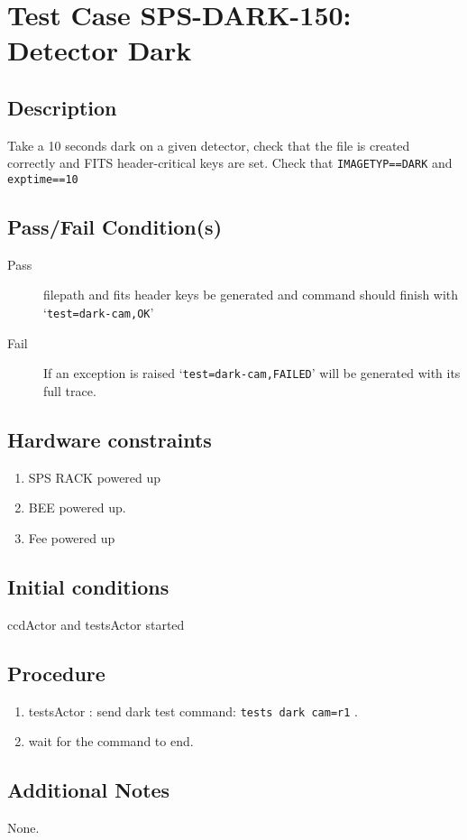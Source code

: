 \section{Test Case SPS-DARK-150: Detector Dark}

\subsection{Description}

Take a 10 seconds dark on a given detector, check that the file is created correctly 
and FITS header-critical keys are set.
Check that \texttt{IMAGETYP==DARK} and \texttt{exptime==10}

\subsection{Pass/Fail Condition(s)}

\begin{description}
\item [Pass] filepath and fits header keys be generated and command should finish with `\texttt{test=dark-cam,OK}'
\item [Fail] If an exception is raised `\texttt{test=dark-cam,FAILED}' will be generated with its full trace.

\end{description}

\subsection{Hardware constraints}

\begin{enumerate}
    \item SPS RACK powered up
    \item BEE powered up.
    \item Fee powered up
\end{enumerate}

\subsection{Initial conditions}

ccdActor and testsActor started

\subsection{Procedure}

\begin{enumerate}
    \item testsActor : send dark test command: \texttt{tests dark cam=r1} .
    \item wait for the command to end.
\end{enumerate}

\subsection{Additional Notes}
None.
